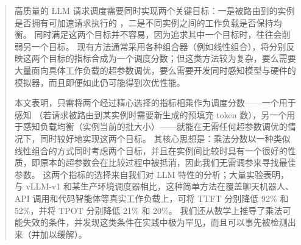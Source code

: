 \begin{abstract}
    \noindent
高质量的 LLM 请求调度需要同时实现两个关键目标：一是被路由到的实例是否拥有可加速请求执行的 {\kvcache}，二是不同实例之间的工作负载是否保持均衡。
同时满足这两个目标并不容易，因为追求其中一个目标时，往往会削弱另一个目标。
现有方法通常采用各种组合器（例如线性组合），将分别反映这两个目标的指标合成为一个调度分数；但这类方法较为复杂，要么需要大量面向具体工作负载的超参数调优，要么需要开发同时感知模型与硬件的模拟器，而且即便如此仍可能得到次优性能。

本文表明，只需将两个经过精心选择的指标相乘作为调度分数——一个用于感知 {\kvcache}（若请求被路由到某实例时需要新生成的预填充 token 数），另一个用于感知负载均衡（实例当前的批大小）——就能在无需任何超参数调优的情况下，同时较好地实现这两个目标。
其核心思想是：乘法分数以一种类似线性组合的方式同时考虑两个目标，并且在实例间比较时具有一个很好的性质，即原本的超参数会在比较过程中被抵消，因此我们无需调参来寻找最佳参数。
这两个指标的选择来自我们对 LLM 特性的分析；大量实验表明，与 vLLM-v1 和某生产环境调度器相比，这种简单方法在覆盖聊天机器人、API 调用和代码智能体等真实工作负载上，可将 TTFT 分别降低 92\% 和 52\%，并将 TPOT 分别降低 21\% 和 20\%。
我们还从数学上推导了乘法可能失效的条件，并发现这类条件在实践中极为罕见，而且可以事先被检测出来（并加以缓解）。

\end{abstract}
